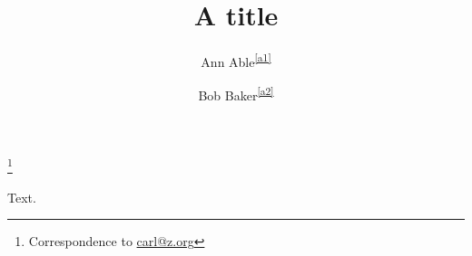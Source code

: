 \documentclass{amsart}
\begin{document}
\title{A title}
\author{Ann Able\textsuperscript{\ref{a1}}}
\address{\label{a1}University X, Town}
\author{Bob Baker\textsuperscript{\ref{a2}}}
\address{\label{a2}University Y, City}
\thanks{Correspondence to \href{mailto:carl@z.org}{carl@z.org}}
\maketitle
Text.
\end{document}
